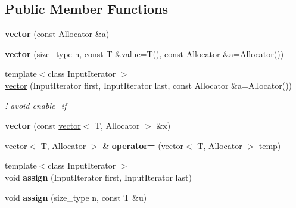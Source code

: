 \subsection*{Public Member Functions}
\begin{DoxyCompactItemize}
\item 
\hypertarget{classyasli_1_1vector_a1a73a9a81e0bfc586ecbf81e18018f98}{}{\bfseries vector} (const Allocator \&a)\label{classyasli_1_1vector_a1a73a9a81e0bfc586ecbf81e18018f98}

\item 
\hypertarget{classyasli_1_1vector_a52eb4ba8801c0553e5ed53bc1c5a1365}{}{\bfseries vector} (size\+\_\+type n, const T \&value=T(), const Allocator \&a=Allocator())\label{classyasli_1_1vector_a52eb4ba8801c0553e5ed53bc1c5a1365}

\item 
\hypertarget{classyasli_1_1vector_a7fe8a6777e43fd92567ce4a88249a27f}{}{\footnotesize template$<$class Input\+Iterator $>$ }\\\hyperlink{classyasli_1_1vector_a7fe8a6777e43fd92567ce4a88249a27f}{vector} (Input\+Iterator first, Input\+Iterator last, const Allocator \&a=Allocator())\label{classyasli_1_1vector_a7fe8a6777e43fd92567ce4a88249a27f}

\begin{DoxyCompactList}\small\item\em ! avoid enable\+\_\+if \end{DoxyCompactList}\item 
\hypertarget{classyasli_1_1vector_ad181d249f0dd3f610baf081cb48d04e0}{}{\bfseries vector} (const \hyperlink{classyasli_1_1vector}{vector}$<$ T, Allocator $>$ \&x)\label{classyasli_1_1vector_ad181d249f0dd3f610baf081cb48d04e0}

\item 
\hypertarget{classyasli_1_1vector_ab306887a28532a074ef72853c2ffddef}{}\hyperlink{classyasli_1_1vector}{vector}$<$ T, Allocator $>$ \& {\bfseries operator=} (\hyperlink{classyasli_1_1vector}{vector}$<$ T, Allocator $>$ temp)\label{classyasli_1_1vector_ab306887a28532a074ef72853c2ffddef}

\item 
\hypertarget{classyasli_1_1vector_a2aabdb8255e254e36380fa419eed1e56}{}{\footnotesize template$<$class Input\+Iterator $>$ }\\void {\bfseries assign} (Input\+Iterator first, Input\+Iterator last)\label{classyasli_1_1vector_a2aabdb8255e254e36380fa419eed1e56}

\item 
\hypertarget{classyasli_1_1vector_a9a4b76a1eed95def763e034d5745129d}{}void {\bfseries assign} (size\+\_\+type n, const T \&u)\label{classyasli_1_1vector_a9a4b76a1eed95def763e034d5745129d}


\end{DoxyCompactItemize}
